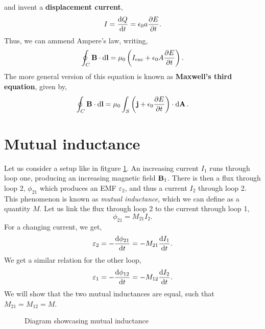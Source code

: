 \documentclass{book}
\begin{document}
and invent a \textbf{displacement current},
\begin{equation}
	I = \dv{Q}{t} = \epsilon_0 a \pdv{E}{t}.
\end{equation}
Thus, we can ammend Ampere's law, writing,
\begin{equation}
	\oint_C \vb{B}\cdot\dd{\vb{l}} = \mu_0\left(I_{\text{enc}} + \epsilon_0 A \pdv{E}{t}\right).
\end{equation}
The more general version of this equation is known as \textbf{Maxwell's third equation}, given by,
\begin{equation}
	\oint_C \vb{B}\cdot \dd{\vb{l}} = \mu_0 \int_S \left(\vb{j} + \epsilon_0 \pdv{E}{t}\right)\cdot\dd{\vb{A}}.
\end{equation}

\section{Mutual inductance}
Let us consider a setup like in fitgure \ref{fig:mutualinductance}. An increasing current $I_1$ runs through loop one, producing an increasing magnetic field $\vb{B}_1$. There is then a flux through loop 2, $\phi_{21}$ which produces an EMF $\varepsilon_2$, and thus a current $I_2$ through loop 2. This phenomenon is known as \textit{mutual inductance}, which we can define as a quantity $M$. Let us link the flux through loop 2 to the current through loop 1,
\begin{equation}
	\phi_{21} = M_{21}I_2.
\end{equation}
For a changing current, we get,
\begin{equation}
	\varepsilon_2 = - \dv{\phi_{21}}{t} = -M_{21}\dv{I_1}{t}.
\end{equation}
We get a similar relation for the other loop,
\begin{equation}
	\varepsilon_1 = - \dv{\phi_{12}}{t} = -M_{12}\dv{I_2}{t}.
\end{equation}
We will show that the two mutual inductances are equal, such that $M_{21} = M_{12} = M$.
\begin{figure}
	\centering
	\caption{Diagram showcasing mutual inductance}
	\label{fig:mutualinductance}
\end{figure}
\\\\
\end{document}

